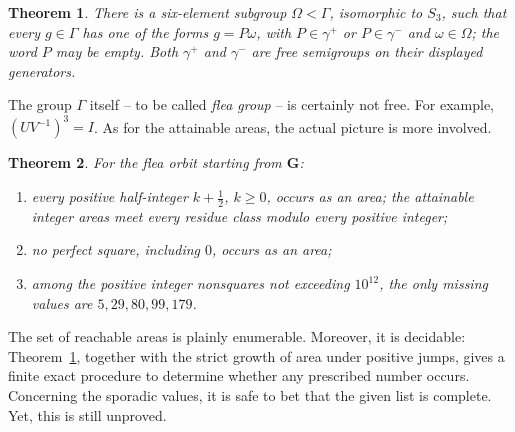\documentclass[12pt]{article}
\newtheorem{theorem}{Theorem}
\theoremstyle{definition}
\theoremstyle{remark}
\newcommand{\mG}{\mathbf G}
\begin{document}
\begin{theorem}\label{thm:normal-form}
There is a six-element subgroup $\Omega<\Gamma$, isomorphic to $S_3$, such
that every $g\in\Gamma$ has one of the forms $g=P\omega$, with
$P\in\gamma^+$ or $P\in\gamma^-$ and $\omega\in\Omega$; the word $P$ may
be empty. Both $\gamma^+$ and $\gamma^-$ are free semigroups on their
displayed generators.
\end{theorem}

The group $\Gamma$ itself -- to be called \emph{flea group} -- is certainly not free. For example, $(UV^{-1})^3=I$. As for the attainable areas, the actual picture is more involved.
\begin{theorem}\label{thm2}
For the flea orbit starting from $\mG$:
\begin{enumerate}[label=\textup{(\roman*)}]
\item every positive half-integer $k+\tfrac12$, $k\ge0$, occurs as an area;
      the attainable integer areas meet every residue class modulo every
      positive integer;
\item no perfect square, including $0$, occurs as an area;
\item among the positive integer nonsquares not exceeding $10^{12}$, the only
      missing values are $5,29,80,99,179$.
\end{enumerate}
\end{theorem}
The set of reachable areas is plainly enumerable. Moreover, it is decidable: Theorem~\ref{thm:normal-form}, together with the
strict growth of area under positive jumps, gives a finite exact procedure
to determine whether any prescribed number occurs. Concerning the sporadic values, it is safe to bet that the given list is complete. Yet, this is still unproved.
\end{document}
